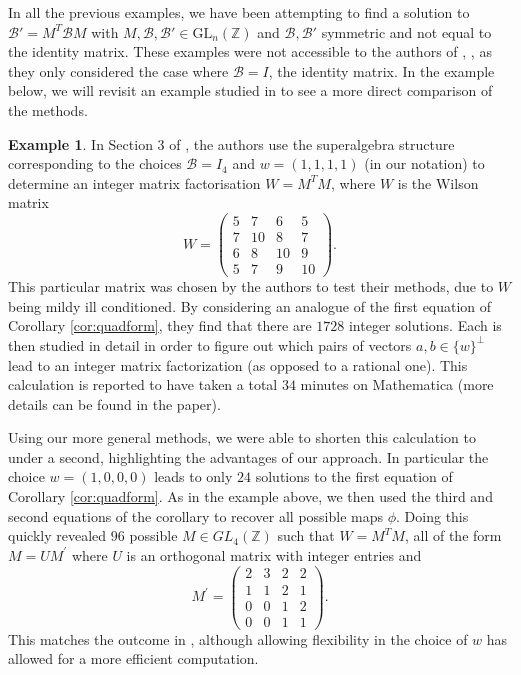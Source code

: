 \documentclass{amsart}
\theoremstyle{plain}
\theoremstyle{definition}
\newtheorem{eg}[theorem]{Example}
\begin{document}
In all the previous examples, we have been attempting to find a solution to $\mathcal{B}' = M^T \mathcal{B}M$ with $M,\mathcal{B},\mathcal{B}'\in \text{GL}_n(\mathbb{Z})$ and $\mathcal{B},\mathcal{B}'$ symmetric and not equal to the identity matrix. These examples were not accessible to the authors of \cite{higham}, \cite{hill}, \cite{lettington} as they only considered the case where $\mathcal{B}=I$, the identity matrix. In the example below, we will revisit an example studied in \cite{higham} to see a more direct comparison of the methods.
\begin{eg}
\label{eg:wilson}
    In Section 3 of \cite{higham}, the authors use the superalgebra structure corresponding to the choices $\mathcal{B} = I_4$ and $w=(1,1,1,1)$ (in our notation) to determine an integer matrix factorisation $W = M^TM$, where $W$ is the Wilson matrix
    \begin{equation*}
        W=\left(\begin{smallmatrix}
            5 & 7 & 6 & 5\\ 7 & 10 & 8 & 7\\ 6 & 8 & 10 & 9\\ 5 & 7 & 9 & 10
        \end{smallmatrix} \right).
    \end{equation*}
    This particular matrix was chosen by the authors to test their methods, due to $W$ being mildy ill conditioned. By considering an analogue of the first equation of Corollary \ref{cor:quadform}, they find that there are $1728$ integer solutions. Each is then studied in detail in order to figure out which pairs of vectors $a,b\in\{w\}^{\perp}$ lead to an integer matrix factorization (as opposed to a rational one). This calculation is reported to have taken a total $34$ minutes on Mathematica (more details can be found in the paper). 
    
    Using our more general methods, we were able to shorten this calculation to under a second, highlighting the advantages of our approach. In particular the choice $w=(1,0,0,0)$ leads to only $24$ solutions to the first equation of Corollary \ref{cor:quadform}. As in the example above, we then used the third and second equations of the corollary to recover all possible maps $\phi$. Doing this quickly revealed $96$ possible $M \in GL_4(\mathbb{Z})$ such that $W = M^TM$, all of the form $M=UM^\prime$ where $U$ is an orthogonal matrix with integer entries and
    \begin{equation*}
        M^\prime=\left(\begin{smallmatrix}
            2&3&2&2 \\ 1&1&2&1 \\ 0&0&1&2 \\ 0&0&1&1
        \end{smallmatrix}\right).
    \end{equation*}
    This matches the outcome in \cite{higham}, although allowing flexibility in the choice of $w$ has allowed for a more efficient computation. 
    \end{eg}
\end{document}
